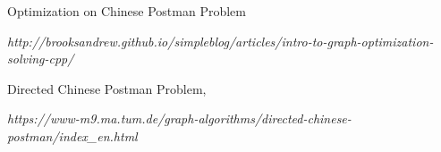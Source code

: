 \documentclass{article}
\begin{document}
\vspace{3cm}

\begin{thebibliography}{2}

\bibitem{}

Optimization on Chinese Postman Problem

\newline

\textit{http://brooksandrew.github.io/simpleblog/articles/intro-to-graph-optimization-solving-cpp/}



\bibitem{}

Directed Chinese Postman Problem,

\newline

\textit{https://www-m9.ma.tum.de/graph-algorithms/directed-chinese-postman/index\_en.html}



\end{thebibliography}
\end{document}
